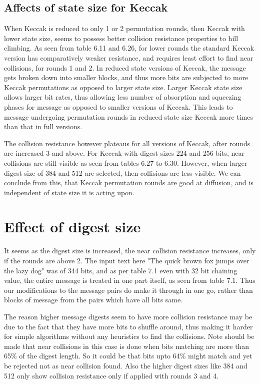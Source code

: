 \subsection{Affects of state size for Keccak}

When Keccak is reduced to only 1 or 2 permutation rounds, then Keccak with lower state size, seems to possess better
collision resistance properties to hill climbing. As seen from table 6.11 and 6.26, for lower rounds the standard Keccak
version has comparatively weaker resistance, and requires least effort to find near collisions, for rounds 1 and 2.
In reduced state versions of Keccak, the message gets broken down into smaller blocks, and thus more bits are subjected
to more Keccak permutations as opposed to larger state size. Larger Keccak state size allows larger bit rates, thus
allowing less number of absorption and squeezing phases for message as opposed to smaller versions of Keccak. This
leads to message undergoing permutation rounds in reduced state size Keccak more times than that in full versions.

The collision resistance however plateaus for all versions of Keccak, after rounds are increased 3 and above. For Keccak
with digest sizes 224 and 256 bits, near collisions are still visible as seen from tables 6.27 to 6.30. However, when 
larger digest size of 384 and 512 are selected, then collisions are less visible. We can conclude from this, that
Keccak permutation rounds are good at diffusion, and is independent of state size it is acting upon.

\newpage

\section{Effect of digest size}

It seems as the digest size is increased, the near collision resistance increases, only if the rounds are above 2. The
input text here "The quick brown fox jumps over the lazy dog" was of 344 bits, and as per table 7.1 even with 32 bit
chaining value, the entire message is treated in one part itself, as seen from table 7.1. Thus our modifications to 
the message pairs do make it through in one go, rather than blocks of message from the pairs which have all bits same.

The reason higher message digests seem to have more collision resistance may be due to the fact that they have more
bits to shuffle around, thus making it harder for simple algorithms without any heuristics to find the collisions. Note
should be made that near collisions in this case is done when bits matching are more than 65\% of the digest length.
So it could be that bits upto 64\% might match and yet be rejected not as near collision found. Also the higher
digest sizes like 384 and 512 only show collision resistance only if applied with rounds 3 and 4.

